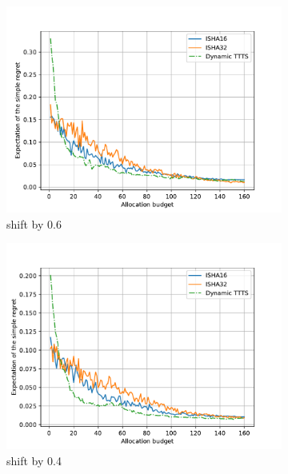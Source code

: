 \begin{figure}[ht]
\begin{subfigure}[t]{0.33\textwidth}
    \centering\includegraphics[width=\textwidth]{Chapter6/img/shift/shift_-6_fix.pdf}
    \caption{shift by 0.6}
  \end{subfigure}%
  \begin{subfigure}[t]{0.33\textwidth}
    \centering\includegraphics[width=\textwidth]{Chapter6/img/shift/shift_-4_fix.pdf}
    \caption{shift by 0.4}
  \end{subfigure}
  \begin{subfigure}[t]{0.33\textwidth}

\end{subfigure}
\end{figure}
